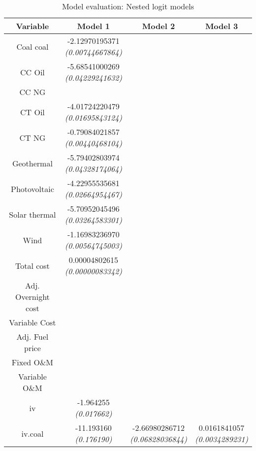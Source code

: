 \documentclass[10pt]{amsart}
\begin{document}
\begin{table}[H]
\caption{Model evaluation: Nested logit models}
\centering
\begin{tabular}{c c c c}
\hline
\hline
Variable & Model 1 & Model 2 & Model 3\\ [0.5ex]
\hline
Coal coal & \makecell{-2.12970195371 \\ {\footnotesize\textit{(0.00744667864)}}} & & \\ 
CC Oil & \makecell{-5.68541000269 \\ {\footnotesize\textit{(0.04229241632)}}} & & \\
CC NG & & & \\
CT Oil & \makecell{-4.01724220479 \\ {\footnotesize\textit{(0.01695843124)}}} & & \\
CT NG & \makecell{-0.79084021857 \\ {\footnotesize\textit{(0.00440468104)}}} & & \\
Geothermal & \makecell{-5.79402803974 \\ {\footnotesize\textit{(0.04328174064)}}} & & \\
Photovoltaic & \makecell{-4.22955535681 \\ {\footnotesize\textit{(0.02664954467)}}} & & \\
Solar thermal & \makecell{-5.70952045496 \\ {\footnotesize\textit{(0.03264583301)}}} & & \\
Wind & \makecell{-1.16983236970 \\ {\footnotesize\textit{(0.00564745003)}}} & & \\
Total cost & \makecell{0.00004802615 \\ {\footnotesize\textit{(0.00000083342)}}} & & \\
Adj. Overnight cost & & & \\
Variable Cost & & & \\
Adj. Fuel price & & & \\
Fixed O\&M & & & \\
Variable O\&M & & & \\
\hline
iv & \makecell{-1.964255 \\ {\footnotesize\textit{(0.017662)}}} & & \\
iv.coal & \makecell{-11.193160 \\ {\footnotesize\textit{(0.176190)}}} & \makecell{-2.66980286712 \\ {\footnotesize\textit{(0.06828036844)}}} & \makecell{0.0161841057 \\ {\footnotesize\textit{(0.0034289231)}}} \\

\end{tabular}
\end{table}
\end{document}
